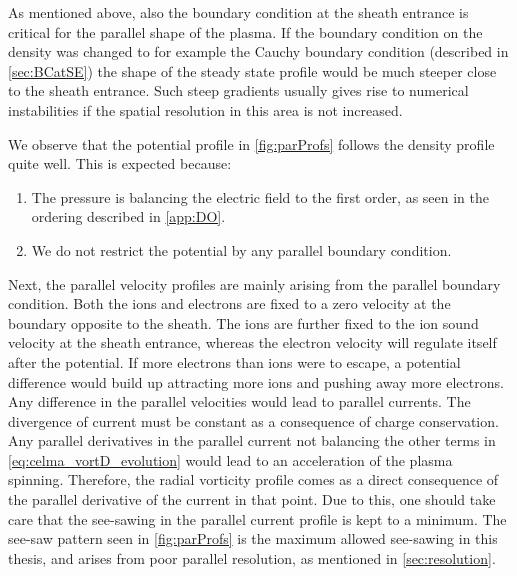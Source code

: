 As mentioned above, also the boundary condition at the sheath entrance is critical for the parallel shape of the plasma.
If the boundary condition on the density was changed to for example the Cauchy boundary condition (described in \cref{sec:BCatSE}) the shape of the steady state profile would be much steeper close to the sheath entrance.
Such steep gradients usually gives rise to numerical instabilities if the spatial resolution in this area is not increased.

We observe that the potential profile in \cref{fig:parProfs} follows the density profile quite well.
This is expected because:
%
\begin{enumerate}[noitemsep]
        \item The pressure is balancing the electric field to the first order, as seen in the ordering described in \ref{app:DO}.
        \item We do not restrict the potential by any parallel boundary condition.
\end{enumerate}

Next, the parallel velocity profiles are mainly arising from the parallel boundary condition.
Both the ions and electrons are fixed to a zero velocity at the boundary opposite to the sheath.
The ions are further fixed to the ion sound velocity at the sheath entrance, whereas the electron velocity will regulate itself after the potential.
If more electrons than ions were to escape, a potential difference would build up attracting more ions and pushing away more electrons.
%
%
Any difference in the parallel velocities would lead to parallel currents.
The divergence of current must be constant as a consequence of charge conservation.
Any parallel derivatives in the parallel current not balancing the other terms in \cref{eq:celma_vortD_evolution} would lead to an acceleration of the plasma spinning.
Therefore, the radial vorticity profile comes as a direct consequence of the parallel derivative of the current in that point.
Due to this, one should take care that the see-sawing in the parallel current profile is kept to a minimum.
The see-saw pattern seen in \cref{fig:parProfs} is the maximum allowed see-sawing in this thesis, and arises from poor parallel resolution, as mentioned in \ref{sec:resolution}.

